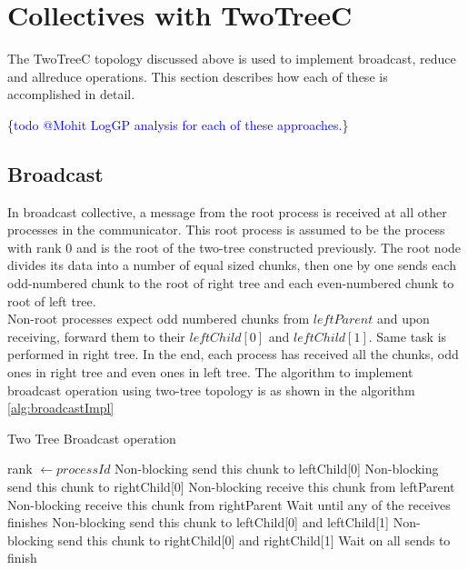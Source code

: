 \documentclass[sigplan,review,anonymous]{acmart}\settopmatter{printfolios=true,printccs=false,printacmref=false}
\begin{document}
\section{Collectives with TwoTreeC}\label{sec:Operations}
The TwoTreeC topology discussed above is used to implement broadcast, reduce and allreduce operations. This section describes how each of these is accomplished in detail.

\ifcmts \{\textcolor{blue}{todo @Mohit LogGP analysis for each of these approaches.}\}

\subsection{Broadcast}
In broadcast collective, a message from the root process is received at all other processes in the communicator. This root process is assumed to be the process with rank 0 and is the root of the two-tree constructed previously. The root node divides its data into a number of equal sized chunks, then one by one sends each odd-numbered chunk to the root of right tree and each even-numbered chunk to root of left tree.\\
Non-root processes expect odd numbered chunks from $leftParent$ and upon receiving, forward them to their $leftChild[0]$ and $leftChild[1]$. Same task is performed in right tree. In the end, each process has received all the chunks, odd ones in right tree and even ones in left tree. The algorithm to implement broadcast operation using two-tree topology is as shown in the algorithm \ref{alg:broadcastImpl}

\begin{algorithm}
  \scriptsize
\caption{Two Tree Broadcast operation}\label{alg:broadcastImpl}
\begin{algorithmic}[1]
\REQUIRE rank $\leftarrow processId$ 
            \STATE Non-blocking send this chunk to leftChild[0]
        \ELSE
            \STATE Non-blocking send this chunk to rightChild[0]
        \ENDIF
    \ENDFOR
{}
            \STATE Non-blocking receive this chunk from leftParent
            \STATE Non-blocking receive this chunk from rightParent
        \ENDIF
    \ENDFOR
        \STATE Wait until any of the receives finishes
            \STATE Non-blocking send this chunk to leftChild[0] and leftChild[1]
            \STATE Non-blocking send this chunk to rightChild[0] and rightChild[1]
        \ENDIF
    \ENDWHILE
\ENDIF
\STATE Wait on all sends to finish
\end{algorithmic}
\end{algorithm}
\end{document}
